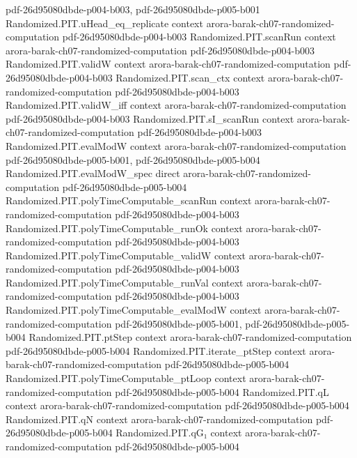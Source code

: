 \begin{theorem}
  {pdf-26d95080dbde-p004-b003,
    pdf-26d95080dbde-p005-b001}
\proofstep
  {Randomized.PIT.uHead_eq_replicate}
  {context}
  {arora-barak-ch07-randomized-computation}
  {pdf-26d95080dbde-p004-b003}
\proofstep
  {Randomized.PIT.scanRun}
  {context}
  {arora-barak-ch07-randomized-computation}
  {pdf-26d95080dbde-p004-b003}
\proofstep
  {Randomized.PIT.validW}
  {context}
  {arora-barak-ch07-randomized-computation}
  {pdf-26d95080dbde-p004-b003}
\proofstep
  {Randomized.PIT.scan_ctx}
  {context}
  {arora-barak-ch07-randomized-computation}
  {pdf-26d95080dbde-p004-b003}
\proofstep
  {Randomized.PIT.validW_iff}
  {context}
  {arora-barak-ch07-randomized-computation}
  {pdf-26d95080dbde-p004-b003}
\proofstep
  {Randomized.PIT.sI_scanRun}
  {context}
  {arora-barak-ch07-randomized-computation}
  {pdf-26d95080dbde-p004-b003}
\proofstep
  {Randomized.PIT.evalModW}
  {context}
  {arora-barak-ch07-randomized-computation}
  {pdf-26d95080dbde-p005-b001,
    pdf-26d95080dbde-p005-b004}
\proofstep
  {Randomized.PIT.evalModW_spec}
  {direct}
  {arora-barak-ch07-randomized-computation}
  {pdf-26d95080dbde-p005-b004}
\proofstep
  {Randomized.PIT.polyTimeComputable_scanRun}
  {context}
  {arora-barak-ch07-randomized-computation}
  {pdf-26d95080dbde-p004-b003}
\proofstep
  {Randomized.PIT.polyTimeComputable_runOk}
  {context}
  {arora-barak-ch07-randomized-computation}
  {pdf-26d95080dbde-p004-b003}
\proofstep
  {Randomized.PIT.polyTimeComputable_validW}
  {context}
  {arora-barak-ch07-randomized-computation}
  {pdf-26d95080dbde-p004-b003}
\proofstep
  {Randomized.PIT.polyTimeComputable_runVal}
  {context}
  {arora-barak-ch07-randomized-computation}
  {pdf-26d95080dbde-p004-b003}
\proofstep
  {Randomized.PIT.polyTimeComputable_evalModW}
  {context}
  {arora-barak-ch07-randomized-computation}
  {pdf-26d95080dbde-p005-b001,
    pdf-26d95080dbde-p005-b004}
\proofstep
  {Randomized.PIT.ptStep}
  {context}
  {arora-barak-ch07-randomized-computation}
  {pdf-26d95080dbde-p005-b004}
\proofstep
  {Randomized.PIT.iterate_ptStep}
  {context}
  {arora-barak-ch07-randomized-computation}
  {pdf-26d95080dbde-p005-b004}
\proofstep
  {Randomized.PIT.polyTimeComputable_ptLoop}
  {context}
  {arora-barak-ch07-randomized-computation}
  {pdf-26d95080dbde-p005-b004}
\proofstep
  {Randomized.PIT.qL}
  {context}
  {arora-barak-ch07-randomized-computation}
  {pdf-26d95080dbde-p005-b004}
\proofstep
  {Randomized.PIT.qN}
  {context}
  {arora-barak-ch07-randomized-computation}
  {pdf-26d95080dbde-p005-b004}
\proofstep
  {Randomized.PIT.qG₁}
  {context}
  {arora-barak-ch07-randomized-computation}
  {pdf-26d95080dbde-p005-b004}

\end{theorem}
